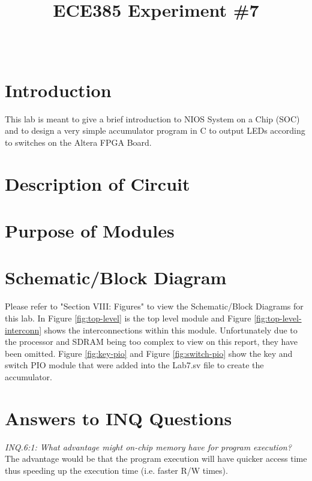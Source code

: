 \documentclass[journal, twocolumn, final,11pt,letterpaper]{IEEEtran}
\title{ECE385 Experiment \#7
	}
\author{
\IEEEauthorblockN{Eric Meyers, Ryan Helsdingen}\\
\IEEEauthorblockA{Section ABG; TAs: Ben Delay, Shuo Liu \\
March 16th, 2016 \\
emeyer7, helsdin2}}
\begin{document}
	
\maketitle
\singlespacing

\section{Introduction}
This lab is meant to give a brief introduction to NIOS System on a Chip (SOC) and to design a very simple accumulator program in C to output LEDs according to switches on the Altera FPGA Board.

\section{Description of Circuit}

\section{Purpose of Modules}

\section{Schematic/Block Diagram}

Please refer to "Section VIII: Figures" to view the Schematic/Block Diagrams for this lab. In Figure \ref{fig:top-level} is the top level module and Figure \ref{fig:top-level-interconn} shows the interconnections within this module. Unfortunately due to the processor and SDRAM being too complex to view on this report, they have been omitted. Figure \ref{fig:key-pio} and Figure \ref{fig:switch-pio} show the key and switch PIO module that were added into the Lab7.sv file to create the accumulator.

\section{Answers to INQ Questions}
\textit{INQ.6:1: What advantage might on-chip memory have for program execution?} \\

The advantage would be that the program execution will have quicker access time thus speeding up the execution time (i.e. faster R/W times). \\
\end{document}
